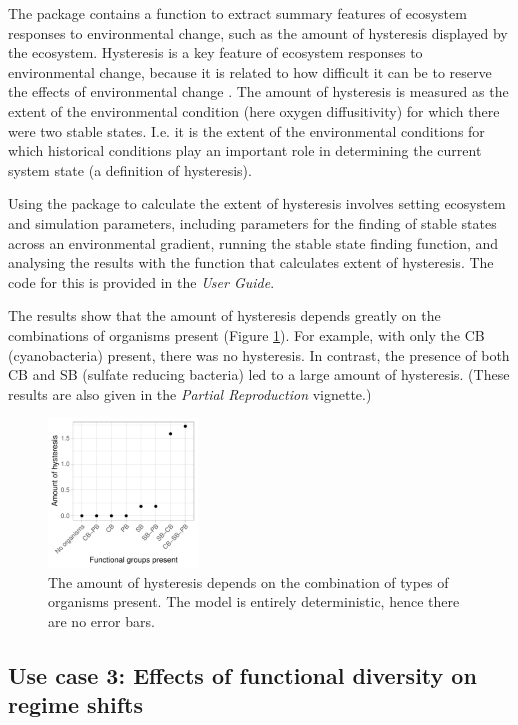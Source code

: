\documentclass[]{elsarticle} %
\begin{document}
The package contains a function to extract summary features of ecosystem
responses to environmental change, such as the amount of hysteresis
displayed by the ecosystem. Hysteresis is a key feature of ecosystem
responses to environmental change, because it is related to how
difficult it can be to reserve the effects of environmental change
\citep{Scheffer2001}. The amount of hysteresis is measured as the extent
of the environmental condition (here oxygen diffusitivity) for which
there were two stable states. I.e. it is the extent of the environmental
conditions for which historical conditions play an important role in
determining the current system state (a definition of hysteresis).

Using the package to calculate the extent of hysteresis involves setting
ecosystem and simulation parameters, including parameters for the
finding of stable states across an environmental gradient, running the
stable state finding function, and analysing the results with the
function that calculates extent of hysteresis. The code for this is
provided in the \emph{User Guide}.

The results show that the amount of hysteresis depends greatly on the
combinations of organisms present (Figure \ref{fig:uc2}). For example,
with only the CB (cyanobacteria) present, there was no hysteresis. In
contrast, the presence of both CB and SB (sulfate reducing bacteria) led
to a large amount of hysteresis. (These results are also given in the
\emph{Partial Reproduction} vignette.)

\begin{figure}

{\centering \includegraphics[width=150px]{figures/gen_uc2_user_guide_hysteresis} 

}

\caption{The amount of hysteresis depends on the combination of types of organisms present. The model is entirely deterministic, hence there are no error bars.}\label{fig:uc2}
\end{figure}

\hypertarget{use-case-3-effects-of-functional-diversity-on-regime-shifts}{%
\subsection{Use case 3: Effects of functional diversity on regime
shifts}\label{use-case-3-effects-of-functional-diversity-on-regime-shifts}}
\end{document}
